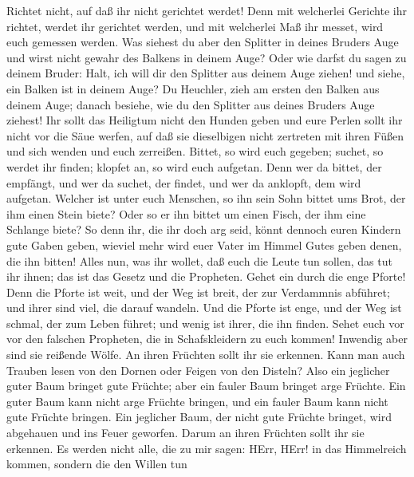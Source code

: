  Richtet nicht, auf daß ihr nicht gerichtet werdet!
 Denn mit welcherlei Gerichte ihr richtet, werdet ihr
gerichtet werden, und mit welcherlei Maß ihr messet, wird euch gemessen
werden.  Was siehest du aber den Splitter in deines Bruders
Auge und wirst nicht gewahr des Balkens in deinem Auge? 
Oder wie darfst du sagen zu deinem Bruder: Halt, ich will dir den
Splitter aus deinem Auge ziehen! und siehe, ein Balken ist in deinem
Auge?  Du Heuchler, zieh am ersten den Balken aus deinem
Auge; danach besiehe, wie du den Splitter aus deines Bruders Auge
ziehest!  Ihr sollt das Heiligtum nicht den Hunden geben und
eure Perlen sollt ihr nicht vor die Säue werfen, auf daß sie dieselbigen
nicht zertreten mit ihren Füßen und sich wenden und euch zerreißen.
 Bittet, so wird euch gegeben; suchet, so werdet ihr finden;
klopfet an, so wird euch aufgetan.  Denn wer da bittet, der
empfängt, und wer da suchet, der findet, und wer da anklopft, dem wird
aufgetan.  Welcher ist unter euch Menschen, so ihn sein Sohn
bittet ums Brot, der ihm einen Stein biete?  Oder so er ihn
bittet um einen Fisch, der ihm eine Schlange biete?  So
denn ihr, die ihr doch arg seid, könnt dennoch euren Kindern gute Gaben
geben, wieviel mehr wird euer Vater im Himmel Gutes geben denen, die ihn
bitten!  Alles nun, was ihr wollet, daß euch die Leute tun
sollen, das tut ihr ihnen; das ist das Gesetz und die Propheten.
 Gehet ein durch die enge Pforte! Denn die Pforte ist weit,
und der Weg ist breit, der zur Verdammnis abführet; und ihrer sind viel,
die darauf wandeln.  Und die Pforte ist enge, und der Weg
ist schmal, der zum Leben führet; und wenig ist ihrer, die ihn finden.
 Sehet euch vor vor den falschen Propheten, die in
Schafskleidern zu euch kommen! Inwendig aber sind sie reißende Wölfe.
 An ihren Früchten sollt ihr sie erkennen. Kann man auch
Trauben lesen von den Dornen oder Feigen von den Disteln? 
Also ein jeglicher guter Baum bringet gute Früchte; aber ein fauler Baum
bringet arge Früchte.  Ein guter Baum kann nicht arge
Früchte bringen, und ein fauler Baum kann nicht gute Früchte bringen.
 Ein jeglicher Baum, der nicht gute Früchte bringet, wird
abgehauen und ins Feuer geworfen.  Darum an ihren Früchten
sollt ihr sie erkennen.  Es werden nicht alle, die zu mir
sagen: HErr, HErr! in das Himmelreich kommen, sondern die den Willen tun
